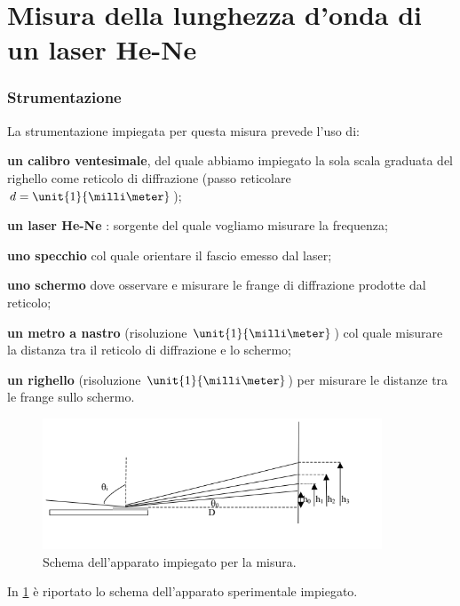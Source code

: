 \part{Misura della lunghezza d'onda di un laser He-Ne } \label{part:Ottica_1A}

\section{Strumentazione}
La strumentazione impiegata per questa misura prevede l'uso di:
\begin{list}{}
\item \textbf{un calibro ventesimale}, del quale abbiamo impiegato la sola scala graduata del righello come reticolo
di diffrazione  (passo reticolare $d = \unit{1}{\milli\meter}$);
\item \textbf{un laser He-Ne} : sorgente del quale vogliamo misurare la frequenza;
\item \textbf{uno specchio} col quale orientare il fascio emesso dal laser;
\item \textbf{uno schermo} dove osservare e misurare le frange di diffrazione prodotte dal reticolo;
\item \textbf{un metro a nastro} (risoluzione $\unit{1}{\milli\meter}$) col quale misurare la distanza tra il reticolo di 
diffrazione e lo schermo;
\item \textbf{un righello} (risoluzione $\unit{1}{\milli\meter}$) per misurare le distanze tra le frange sullo schermo.
\end{list}
\bigskip


\begin{figure} [!h]
	\centering
	\includegraphics[width=0.9\textwidth]{./pictures/immagine1}
	\caption{Schema dell'apparato impiegato per la misura.}
	\label{fig:schema_appar}
\end{figure}
In \figurename{ \ref{fig:schema_appar}} è riportato lo schema dell'apparato sperimentale impiegato. 